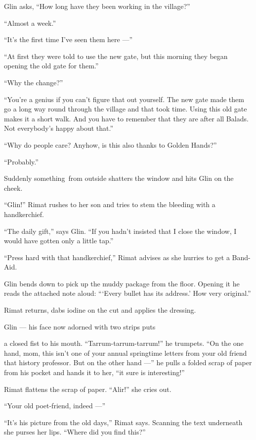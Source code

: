 \documentclass[twoside,11pt,openany]{book}
\begin{document}
{Glin asks, ``How long have they been working in the village?''

{}``Almost a week.''

{}``It's the first time I've seen them here ---''

{{}``}At first{ they
were told to use the new gate, but this morning they began opening the old gate for them.'' }

{{}``Why}{ }{the
change?'' }

``You're a genius if you can't figure that out yourself. The new gate made them go a long way
round through the village and that took time.  Using this old gate makes it a short walk. And
you have to remember that they are after all Balads. Not everybody's happy about
that.''

``Why do people care? Anyhow, is this
also {thanks
to }Golden Hands?''

``Probably.''

Suddenly something~from outside shatters the window and hits Glin on
the cheek.

{}``Glin!'' Rimat rushes to her son and tries to stem the bleeding
with a handkerchief.

{{}``The daily gift,'' says Glin. ``If you hadn't
insisted }that {I close the window, I would have gotten only a
}little tap{.'' }

{{}``Press hard with }that
handkerchief,{{}'' Rimat advises as she hurries to get
a}{ }Band-Aid.

Glin bends down to pick up the muddy
package from the floor. Opening it he reads the attached note aloud:
``{\thinspace}`Every bullet has its address.' How very
original.''

{Rimat returns, dabs iodine on the cut and }applies the
dressing{. }

Glin --- his face now adorned with two strips
puts }a closed
fist {to his mouth. }{}``Tarrum-tarrum-tarrum!{}'' he trumpets. ``On
the one hand, mom,{ this isn't one of your annual springtime
letters from your old friend that}{ }{history
professor. But on the other hand ---'' he pulls a folded scrap of paper from his pocket and hands it
to }her,{ ``it sure is interesting!{}'' }

Rimat flattens the scrap of paper. ``Alir!'' she cries out.

{}``Your old poet-friend, indeed ---''

{}``It's his picture from the old days,{}'' Rimat says. Scanning the
text underneath she purses her lips. ``Where did you find this?{}''
\end{document}

